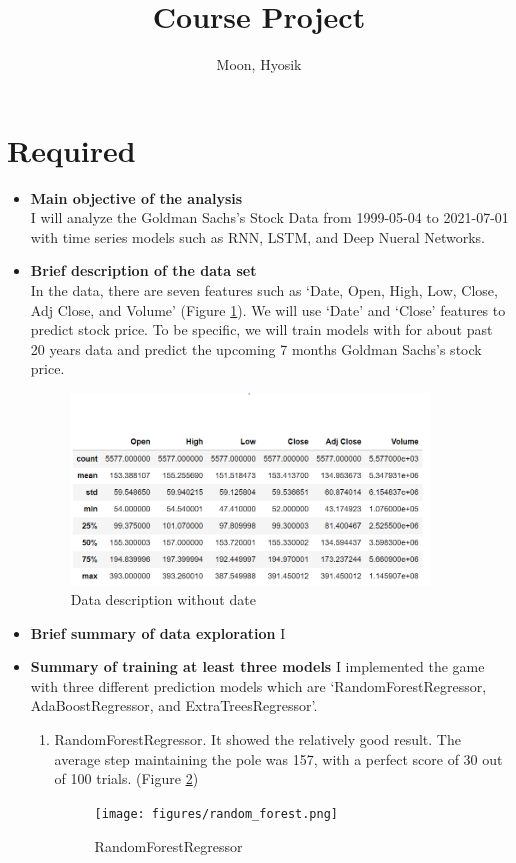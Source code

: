 \documentclass[12pt]{article}
\title{Course Project}
\author{
  Moon, Hyosik
  }
\begin{document}
\maketitle

\section{Required}

\begin{itemize}
\item \textbf{Main objective of the analysis} \\
I will analyze the Goldman Sachs's Stock Data from 1999-05-04 to 2021-07-01 with time series models such as RNN, LSTM, and Deep Nueral Networks.

\item \textbf{Brief description of the data set} \\
In the data, there are seven features such as `Date, Open, High, Low, Close, Adj Close, and Volume' (Figure \ref{data}). We will use `Date' and `Close' features to predict stock price. To be specific, we will train models with for about past 20 years data and predict the upcoming 7 months Goldman Sachs's stock price. 

\begin{figure}[H]
  \centering
  \includegraphics[width=0.9\textwidth]{figures/data.png}
  \caption{Data description without date}\label{data}
\end{figure}

\item \textbf{Brief summary of data exploration}
I 

\item \textbf{Summary of training at least three models} I implemented the game with three different prediction models which are  `RandomForestRegressor, AdaBoostRegressor, and ExtraTreesRegressor'.
    \begin{enumerate}
      \item RandomForestRegressor. It showed the relatively good result. The average step maintaining the pole was 157, with a perfect score of 30 out of 100 trials. (Figure \ref{random_forest})
      \begin{figure}[H]
        \centering
        \texttt{[image: figures/random\_forest.png]}
        \caption{RandomForestRegressor}\label{random_forest}
      \end{figure}


\end{enumerate}
\end{itemize}
\end{document}
